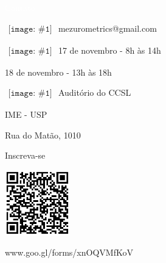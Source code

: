 
\newcommand{\ContactEntry}[2]{
	$\begin{array}{l}
	{\texttt{[image: \#1]}}
	\end{array}
	$ #2
}


\LARGE
\noindent\colorbox{materialGreen}
{\parbox[c][25pt][c]{\textwidth}{\hspace{15pt}\textcolor{white}{Contato}}} %

\begin{multicols}{3}

\large

\ContactEntry{images/green/mail9}{mezurometrics@gmail.com}

\ContactEntry{images/green/black70}{17 de novembro - 8h às 14h

\hspace*{28pt} 18 de novembro - 13h às 18h
}

\columnbreak

\ContactEntry{images/green/house3}{Auditório do CCSL

\hspace*{28pt} IME - USP

\hspace*{28pt} Rua do Matão, 1010}

\columnbreak

\hspace*{25pt} Inscreva-se
\vspace{.2cm}

\hspace*{20pt} \includegraphics[height=80pt]{images/design_sprint_form_qr.png}

\hspace*{2pt} \textcolor{materialGreen}{\small www.goo.gl/forms/xnOQVMfKoV}

\end{multicols}
